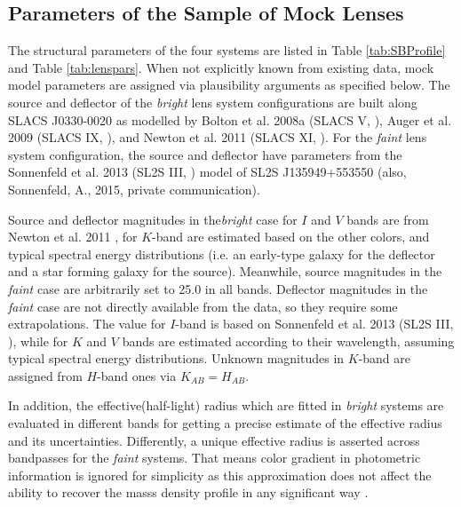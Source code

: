 \documentclass[a4paper,11pt]{article}
\begin{document}
\subsection{Parameters of the Sample of Mock Lenses}

The structural parameters of the four systems are listed in Table
\ref{tab:SBProfile} and Table \ref{tab:lenspars}. When not explicitly known from existing data,
mock model parameters are assigned via plausibility arguments as
specified below. The source and deflector of the \textit{bright} lens
system configurations are built along SLACS J0330-0020 as modelled by
Bolton et al. 2008a (SLACS V, \cite{2008ApJ...682..964B}), Auger et
al. 2009 (SLACS IX, \cite{2009ApJ...705.1099A}), and Newton et
al. 2011 (SLACS XI, \cite{2011ApJ...734..104N}). For the
\textit{faint} lens system configuration, the source and deflector
have parameters from the Sonnenfeld et al. 2013 (SL2S III,
\cite{2013ApJ...777...97S}) model of SL2S J135949+553550 
(also, Sonnenfeld, A., 2015, private communication).

Source and deflector magnitudes in the\textit{bright} case for $I$ and
$V$ bands are from Newton et al. 2011 \cite{2011ApJ...734..104N}, for
$K$-band are estimated based on the other colors, and typical spectral
energy distributions (i.e. an early-type galaxy for the deflector and
a star forming galaxy for the source). Meanwhile, source magnitudes in
the \textit{faint} case are arbitrarily set to 25.0 in all
bands. Deflector magnitudes in the \textit{faint} case are not
directly available from the data, so they require some
extrapolations. The value for $I$-band is based on Sonnenfeld et
al. 2013 (SL2S III,
\cite{2013ApJ...777...97S}), while for $K$ and $V$ bands are estimated
according to their wavelength, assuming typical spectral energy
distributions. Unknown magnitudes in $K$-band are assigned from
$H$-band ones via $K_{AB}=H_{AB}$.

In addition, the effective(half-light) radius which are fitted in \textit{bright} systems are
evaluated in different bands for getting a precise estimate of the
effective radius and its uncertainties. Differently, a unique
effective radius is asserted across bandpasses for the \textit{faint}
systems. That means color gradient in photometric information is
ignored for simplicity as this approximation does not affect the
ability to recover the masss density profile in any significant way
\cite{2013ApJ...777...97S}.

\end{document}
